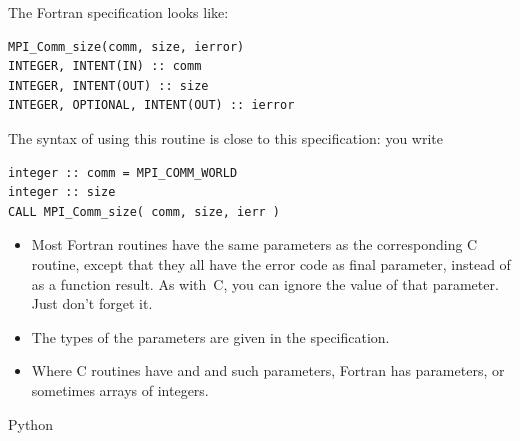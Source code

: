 The Fortran specification looks like:
\begin{verbatim}
MPI_Comm_size(comm, size, ierror)
INTEGER, INTENT(IN) :: comm
INTEGER, INTENT(OUT) :: size
INTEGER, OPTIONAL, INTENT(OUT) :: ierror
\end{verbatim}
The syntax of using this routine is close to this specification: you
write
\begin{verbatim}
integer :: comm = MPI_COMM_WORLD
integer :: size
CALL MPI_Comm_size( comm, size, ierr )
\end{verbatim}
\begin{itemize}
\item Most Fortran routines have the same parameters as the
  corresponding C routine, except that they all have the error code as
  final parameter, instead of as a function result. As with~C, you can
  ignore the value of that parameter. Just don't forget it.
\item The types of the parameters are given in the specification.
\item Where C routines have  and  and such
  parameters, Fortran has  parameters, or sometimes arrays
  of integers.
\end{itemize}

 {Python}

